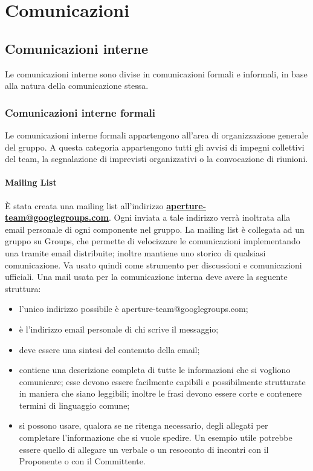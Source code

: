 \newpage
\section{Comunicazioni}
\label{3.0}

\subsection{Comunicazioni interne}
\label{3.2}
Le comunicazioni interne sono divise in comunicazioni formali e informali, in base alla natura della comunicazione stessa.

\subsubsection{Comunicazioni interne formali}
Le comunicazioni interne formali appartengono all'area di organizzazione generale del gruppo. A questa categoria appartengono tutti gli avvisi di impegni collettivi del team, la segnalazione di imprevisti organizzativi o la convocazione di riunioni.

\paragraph{Mailing List}
\label{3.2.2}
È stata creata una mailing list all'indirizzo \textbf{\url{aperture-team@googlegroups.com}}.
Ogni  inviata a tale indirizzo verrà inoltrata alla email personale di ogni componente nel gruppo.
La mailing list è collegata ad un gruppo su  Groups, che permette di velocizzare le comunicazioni implementando una  tramite email distribuite; inoltre mantiene uno storico di qualsiasi comunicazione. Va usato quindi come strumento per discussioni e comunicazioni ufficiali.
Una mail usata per la comunicazione interna deve avere la seguente struttura:
\begin{itemize}
\item {} l'unico indirizzo possibile è aperture-team@googlegroups.com;
\item {} è l'indirizzo email personale di chi scrive il messaggio;
\item {} deve essere una sintesi del contenuto della email;
\item {} contiene una descrizione completa di tutte le informazioni che si vogliono comunicare; esse devono essere facilmente capibili e possibilmente strutturate in maniera che siano leggibili; inoltre le frasi devono essere corte e contenere termini di linguaggio comune;
\item {} si possono usare, qualora se ne ritenga necessario, degli allegati per completare l'informazione che si vuole spedire. Un esempio utile potrebbe essere quello di allegare un verbale o un resoconto di incontri con il Proponente  o con il Committente.
\end{itemize}


